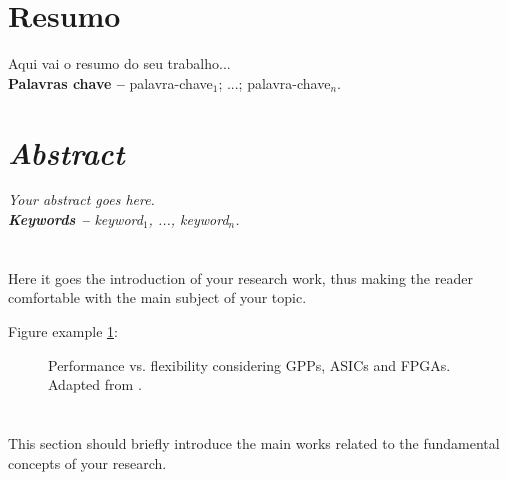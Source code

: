 \documentclass[12pt, a4paper]{article}
\begin{document}
\makeourtitle

\tableofcontents

\newpage
\section*{Resumo}
Aqui vai o resumo do seu trabalho...\\%


\textbf{Palavras chave --} palavra-chave$_1$; ...; palavra-chave$_n$.


\newpage
\section*{\textit{Abstract}}
\textit{
  Your abstract goes here.
}\\%

\textit{\textbf{Keywords --} keyword$_1$, ..., keyword$_n$.}


\newpage
\section{\sectionI}
\label{sec:intro}
Here it goes the introduction of your research work, thus making the reader comfortable with the main subject of your topic.

Figure example \ref{fig:perf_flex}:

\begin{figure}[ht]
	\centering
	\caption{Performance vs. flexibility considering GPPs, ASICs and FPGAs.
	  Adapted from \cite{Bobda2007a}.}
	\label{fig:perf_flex}
\end{figure}


\section{\sectionII}
\label{sec:rel-work}
This section should briefly introduce the main works related to the fundamental concepts of your research.
\end{document}
